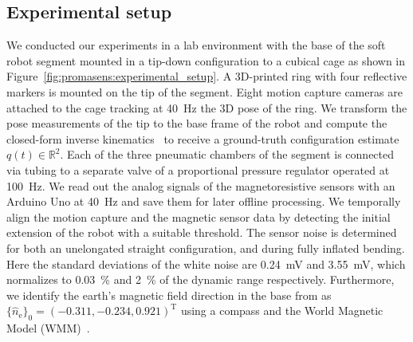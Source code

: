 \subsection{Experimental setup}
We conducted our experiments in a lab environment with the base of the soft robot segment mounted in a tip-down configuration to a cubical cage as shown in Figure~\ref{fig:promasens:experimental_setup}.
A 3D-printed ring with four reflective markers is mounted on the tip of the segment.
Eight motion capture cameras are attached to the cage tracking at \SI{40}{Hz} the 3D pose of the ring.
We transform the pose measurements of the tip to the base frame of the robot and compute the closed-form inverse kinematics~\cite{della2020improved} to receive a ground-truth configuration estimate $q(t) \in \mathbb{R}^2$.
Each of the three pneumatic chambers of the segment is connected via tubing to a separate valve of a proportional pressure regulator operated at \SI{100}{Hz}. %
We read out the analog signals of the magnetoresistive sensors with an Arduino Uno at \SI{40}{Hz} and save them for later offline processing. 
We temporally align the motion capture and the magnetic sensor data by detecting the initial extension of the robot with a suitable threshold.
The sensor noise is determined for both an unelongated straight configuration, and during fully inflated bending. Here the standard deviations of the white noise are \SI{0.24}{mV} and \SI{3.55}{mV}, which normalizes to \SI{0.03}{\percent} and \SI{2}{\percent} of the dynamic range respectively.
Furthermore, we identify the earth's magnetic field direction in the base from as $\{ \hat{n}_{\mathrm{e}} \}_{0} = (-0.311, -0.234, 0.921)^\mathrm{T}$ using a compass and the World Magnetic Model (WMM)~\cite{chulliat2020us}.


